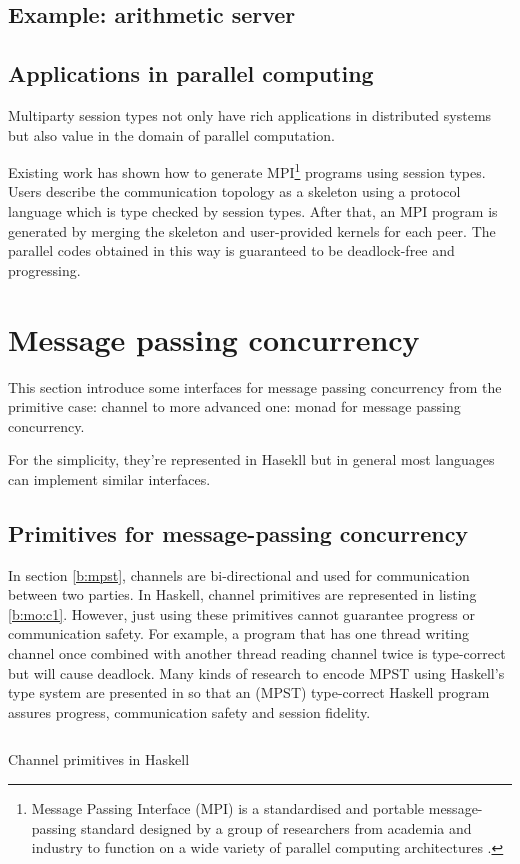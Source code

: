 \subsection{Example: arithmetic server}
\subsection{Applications in parallel computing} \label{b:mpst:app}
Multiparty session types not only have rich applications in distributed systems but also value in the domain of parallel computation. 

Existing work\cite{ngSafeMPICode} has shown how to generate MPI\footnote{Message Passing Interface (MPI) is a standardised and portable message-passing standard designed by a group of researchers from academia and industry to function on a wide variety of parallel computing architectures \cite{MessagePassingInterface2018}.} programs using session types. Users describe the communication topology as a skeleton using a protocol language which is type checked by session types. After that, an MPI program is generated by merging the skeleton and user-provided kernels for each peer. The parallel codes obtained in this way is guaranteed to be deadlock-free and progressing. 

\section{Message passing concurrency}
This section introduce some interfaces for message passing concurrency from the primitive case: channel to more advanced one: monad for message passing concurrency.

For the simplicity, they're represented in Hasekll but in general most languages can implement similar interfaces. 
\subsection{Primitives for message-passing concurrency}
In section \ref{b:mpst}, channels are bi-directional and used for communication between two parties. In Haskell, channel primitives are represented in listing \ref{b:mo:c1}. However, just using these primitives cannot guarantee progress or communication safety. For example, a program that has one thread writing channel once combined with another thread reading channel twice is type-correct but will cause deadlock. Many kinds of research to encode MPST using Haskell's type system are presented in \cite{orchardSessionTypesLinearity} so that an (MPST) type-correct Haskell program assures progress, communication safety and session fidelity.
\begin{listing}[ht]
  \inputminted{haskell}{background/mo-chan.hs}
  \caption{Channel primitives in Haskell}
  \label{b:mo:c1}
\end{listing}
